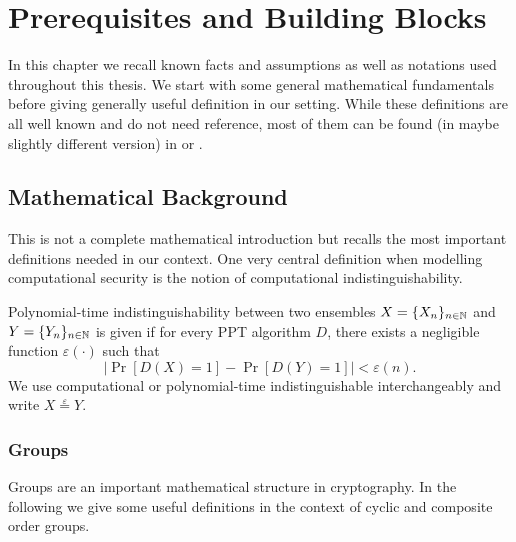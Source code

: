 
\chapter{Prerequisites and Building Blocks}\label{ch:prelims}


In this chapter we recall known facts and assumptions as well as notations used throughout this thesis.
We start with some general mathematical fundamentals before giving generally useful definition in our setting.
While these definitions are all well known and do not need reference, most of them can be found (in maybe slightly different version) in \citet{katz2008introduction} or \citet{Goldreich2001}.

\section{Mathematical Background}
This is not a complete mathematical introduction but recalls the most important definitions needed in our context.
One very central definition when modelling computational security is the notion of computational indistinguishability.

\begin{definition}
Polynomial-time indistinguishability between two ensembles $X=\{X_n\}_{n\in\mathbb{N}}$ and $Y=\{Y_n\}_{n\in\mathbb{N}}$ is given if for every \ac{PPT} algorithm $D$, there exists a negligible function $\varepsilon(\cdot)$ such that
\[
  \left| \Pr[D(X) = 1] - \Pr[D(Y) = 1] \right| < \varepsilon(n).
\]
We use computational or polynomial-time indistinguishable interchangeably and write $X\stackrel{\varepsilon}{=}Y$.
\eod
\end{definition}

\subsection{Groups}
Groups are an important mathematical structure in cryptography.
In the following we give some useful definitions in the context of cyclic and composite order groups.

